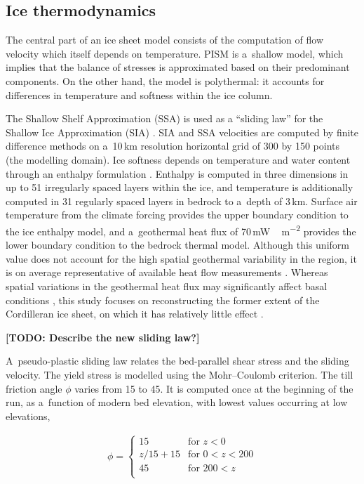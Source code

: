 \documentclass[tc, ms]{copernicus}
\def\todo#1{\textcolor[rgb]{0.5,0,0}{\textbf{[TODO: #1]}}}
\begin{document}
\subsection{Ice thermodynamics}

The central part of an ice sheet model consists of the computation of flow
velocity which itself depends on temperature. PISM is a~shallow model, which
implies that the balance of stresses is approximated based on their predominant
components. On the other hand, the model is polythermal: it accounts for
differences in temperature and softness within the ice column.

The Shallow Shelf Approximation (SSA) is used as a ``sliding law'' for the
Shallow Ice Approximation (SIA) \citep{bueler-brown-2009,winkelmann-etal-2011}.
SIA and SSA velocities are computed by finite difference methods on a~10\,km
resolution horizontal grid of 300 by 150 points (the modelling domain). Ice
softness depends on temperature and water content through an enthalpy
formulation \citep{aschwanden-blatter-2009,aschwanden-etal-2012}. Enthalpy is
computed in three dimensions in up to 51 irregularly spaced layers within the
ice, and temperature is additionally computed in 31 regularly spaced layers in
bedrock to a~depth of 3\,km. Surface air temperature from the climate forcing
provides the upper boundary condition to the ice enthalpy model, and
a~geothermal heat flux of 70\,\unit{mW\,m^{-2}} provides the lower boundary
condition to the bedrock thermal model. Although this uniform value does not
account for the high spatial geothermal variability in the region, it is on
average representative of available heat flow measurements
\citep{artemieva-mooney-2001,blackwell-richards-2004}. Whereas spatial
variations in the geothermal heat flux may significantly affect basal
conditions \citep{pattyn-2010}, this study focuses on reconstructing the former
extent of the Cordilleran ice sheet, on which it has relatively little effect
\citep{rogozhina-etal-2012}.

\todo{Describe the new sliding law?}

A~pseudo-plastic sliding law \citep{aschwanden-etal-2013} relates the
bed-parallel shear stress and the sliding velocity. The yield stress is
modelled using the Mohr--Coulomb criterion. The till friction angle $\phi$
varies from 15 to 45{\degree}. It is computed once at the beginning of the run,
as a~function of modern bed elevation, with lowest values occurring at low
elevations,

\begin{align}
  \phi =
  \begin{cases}
    15      & \text{for }       z<  0 \\
    z/15+15 & \text{for }    0 <z<200 \\
    45      & \text{for }  200 <z     \\
  \end{cases}
\end{align}
\end{document}
